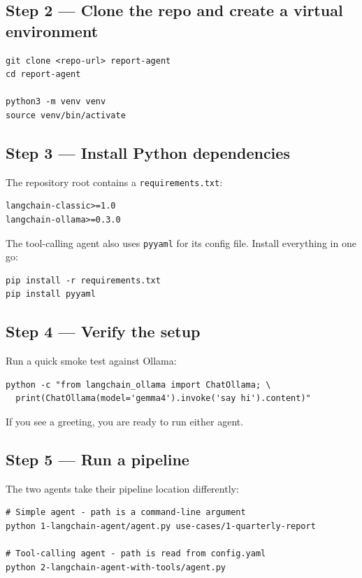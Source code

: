 \documentclass[12pt, a4paper]{article}
\begin{document}
\subsection{Step 2 — Clone the repo and create a virtual environment}

\begin{lstlisting}[style=shellstyle]
git clone <repo-url> report-agent
cd report-agent

python3 -m venv venv
source venv/bin/activate
\end{lstlisting}

\subsection{Step 3 — Install Python dependencies}

The repository root contains a \texttt{requirements.txt}:

\begin{lstlisting}[language={}]
langchain-classic>=1.0
langchain-ollama>=0.3.0
\end{lstlisting}

The tool-calling agent also uses \texttt{pyyaml} for its config file. Install everything in one go:

\begin{lstlisting}[style=shellstyle]
pip install -r requirements.txt
pip install pyyaml
\end{lstlisting}

\subsection{Step 4 — Verify the setup}

Run a quick smoke test against Ollama:

\begin{lstlisting}[style=shellstyle]
python -c "from langchain_ollama import ChatOllama; \
  print(ChatOllama(model='gemma4').invoke('say hi').content)"
\end{lstlisting}

If you see a greeting, you are ready to run either agent.

\subsection{Step 5 — Run a pipeline}

The two agents take their pipeline location differently:

\begin{lstlisting}[style=shellstyle]
# Simple agent - path is a command-line argument
python 1-langchain-agent/agent.py use-cases/1-quarterly-report

# Tool-calling agent - path is read from config.yaml
python 2-langchain-agent-with-tools/agent.py
\end{lstlisting}
\end{document}
